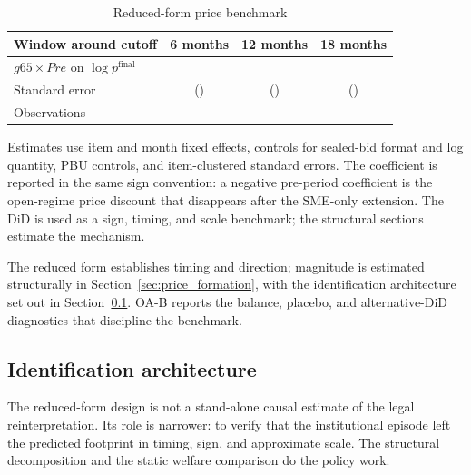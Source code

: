\begin{table}[!htbp]
\centering
\begin{threeparttable}
\caption{Reduced-form price benchmark}
\label{tab:did_benchmark_v8}
\small
\setlength{\tabcolsep}{7pt}
\begin{tabular}{lccc}
\toprule
Window around cutoff & 6 months & 12 months & 18 months \\
\midrule
$g65 \times Pre$ on $\log p^{\mathrm{final}}$ & \didPriceSixPbu{} & \didPriceTwelvePbu{} & \didPriceEighteenPbu{} \\
Standard error & (\didPriceSixSe{}) & (\didPriceTwelveSe{}) & (\didPriceEighteenSe{}) \\
Observations & \didPriceSixN{} & \didPriceTwelveN{} & \didPriceEighteenN{} \\
\bottomrule
\end{tabular}
\begin{tablenotes}\footnotesize
\item Estimates use item and month fixed effects, controls for sealed-bid
format and log quantity, PBU controls, and item-clustered standard errors.
The coefficient is reported in the same sign convention: a negative
pre-period coefficient is the open-regime price discount that disappears after
the SME-only extension. The DiD is used as a sign, timing, and scale benchmark;
the structural sections estimate the mechanism.
\end{tablenotes}
\end{threeparttable}
\end{table}

The reduced form establishes timing and direction; magnitude is estimated
structurally in Section~\ref{sec:price_formation}, with the identification
architecture set out in Section~\ref{sec:identification_architecture}. OA-B
reports the balance, placebo, and alternative-DiD diagnostics that
discipline the benchmark.

\subsection{Identification architecture}\label{sec:identification_architecture}

The reduced-form design is not a stand-alone causal estimate of the legal
reinterpretation. Its role is narrower: to verify that the institutional
episode left the predicted footprint in timing, sign, and approximate
scale. The structural decomposition and the static welfare comparison do
the policy work.

